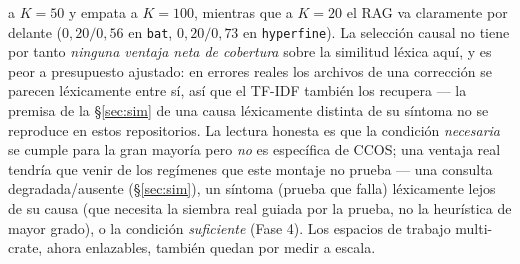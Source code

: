 \documentclass[11pt]{article}
\newcommand{\code}[1]{\texttt{#1}}
\begin{document}
a $K{=}50$ y empata a $K{=}100$, mientras que a $K{=}20$ el RAG va claramente por
delante ($0{,}20/0{,}56$ en \code{bat}, $0{,}20/0{,}73$ en \code{hyperfine}). La
selección causal no tiene por tanto \emph{ninguna ventaja neta de cobertura} sobre la
similitud léxica aquí, y es peor a presupuesto ajustado: en errores reales los archivos
de una corrección se parecen léxicamente entre sí, así que el TF-IDF también los
recupera --- la premisa de la \S\ref{sec:sim} de una causa léxicamente distinta de su
síntoma no se reproduce en estos repositorios. La lectura honesta es que la condición
\emph{necesaria} se cumple para la gran mayoría pero \emph{no} es específica de CCOS;
una ventaja real tendría que venir de los regímenes que este montaje no prueba --- una
consulta degradada/ausente (\S\ref{sec:sim}), un síntoma (prueba que falla) léxicamente
lejos de su causa (que necesita la siembra real guiada por la prueba, no la heurística
de mayor grado), o la condición \emph{suficiente} (Fase 4). Los espacios de trabajo
multi-crate, ahora enlazables, también quedan por medir a escala.
\end{document}
